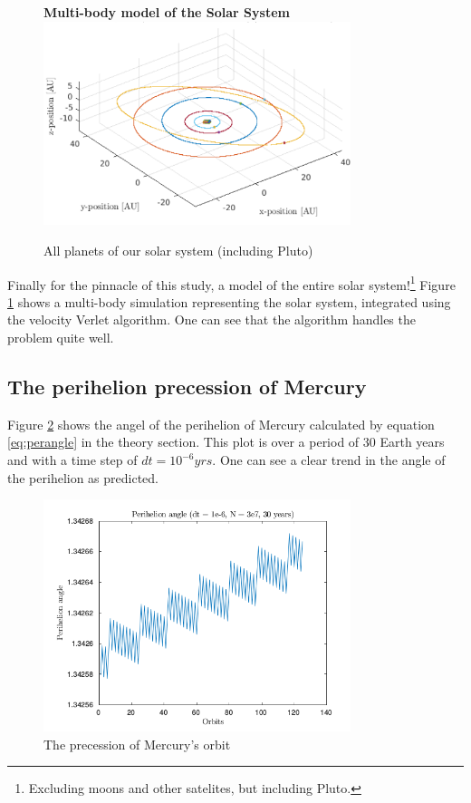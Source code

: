 \documentclass[10pt,a4paper]{amsart}
\begin{document}
\begin{figure}
	\centering
	\textbf{Multi-body model of the Solar System}
	\includegraphics[width=0.8\textwidth]{../figures/multibody.png}
	\caption{All planets of our solar system (including Pluto) \label{fig:multibody}}
\end{figure}

Finally for the pinnacle of this study, a model of the entire solar system!\footnote{Excluding moons and other satelites, but including Pluto.} Figure \ref{fig:multibody} shows a multi-body simulation representing the solar system, integrated using the velocity Verlet algorithm. One can see that the algorithm handles the problem quite well.

\subsection{The perihelion precession of Mercury}

Figure \ref{fig:perangle} shows the angel of the perihelion of Mercury calculated by equation \ref{eq:perangle} in the theory section. This plot is over a period of 30 Earth years and with a time step of $dt = 10^{-6}yrs$. One can see a clear trend in the angle of the perihelion as predicted.

\begin{figure}
	\centering
	\includegraphics[width=0.8\textwidth]{../figures/periangle30yrs.png}
	\caption{The precession of Mercury's orbit\label{fig:perangle}}
\end{figure}
\end{document}
